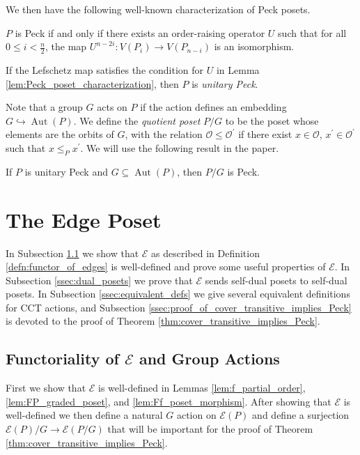 \documentclass[smallextended, envcountsame, numbook]{svjour3}
\numberwithin{equation}{section}
\newcommand\ssec{\subsection}
\newcommand\Aut{\operatorname{Aut}}
\begin{document}
\noindent We then have the following well-known characterization of Peck posets.

\begin{lemma}\label{lem:Peck_poset_characterization}
$P$ is Peck if and only if there exists an order-raising operator $U$ such that for all $0\le i < \frac{n}{2}$, the map $U^{n-2i}\colon V(P_i)\rightarrow V(P_{n-i})$ is an isomorphism.
\end{lemma}

\begin{definition}
If the Lefschetz map satisfies the condition for $U$ in Lemma \ref{lem:Peck_poset_characterization}, then $P$ is \textit{unitary Peck}.
\end{definition}

Note that a group $G$ acts on $P$ if the action defines an embedding $G\hookrightarrow \Aut(P)$. We define the \textit{quotient poset} $P/G$ to be the poset whose elements are the orbits of $G$, with the relation $\mathcal{O}\le \mathcal{O}^\prime$ if there exist $x\in \mathcal{O}$, $x^\prime\in \mathcal{O}^\prime$ such that $x\le_{P} x^\prime$.  We will use the following result in the paper.

\begin{theorem}
\label{thm:quotients_of_unitary_peck_posets}
If $P$ is unitary Peck and $G\subseteq\Aut(P)$, then $P/G$ is Peck.
\end{theorem}



\section{The Edge Poset}
\label{sec:functor_of_edges}

In Subsection \ref{ssec:functoriality} we show that $\mathcal E$ as described in Definition \ref{defn:functor_of_edges} is well-defined and prove some useful properties of $\mathcal E$.  In Subsection \ref{ssec:dual_posets} we prove that $\mathcal{E}$ sends self-dual posets to self-dual posets.  In Subsection \ref{ssec:equivalent_defs} we give several equivalent definitions for CCT actions, and Subsection \ref{ssec:proof_of_cover_transitive_implies_Peck} is devoted to the proof of Theorem \ref{thm:cover_transitive_implies_Peck}.

\ssec{Functoriality of $\mathcal E$ and Group Actions}
\label{ssec:functoriality}
First we show that $\mathcal{E}$ is well-defined in Lemmas \ref{lem:f_partial_order}, \ref{lem:FP_graded_poset}, and \ref{lem:Ff_poset_morphism}.  After showing that $\mathcal E$ is well-defined we then define a natural $G$ action on $\mathcal E(P)$ and define a surjection $\mathcal E(P)/G\rightarrow \mathcal E(P/G)$ that will be important for the proof of Theorem \ref{thm:cover_transitive_implies_Peck}.
\end{document}
